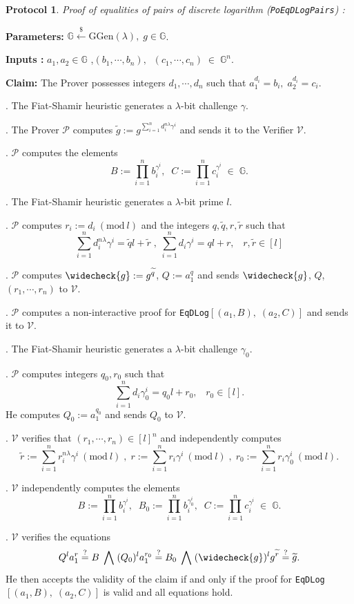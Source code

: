 \documentclass[11pt, lettersize, notitlepage, leqno, footskip=0.6cm]{article}
\newcommand{\slim}{\sum\limits}
\newcommand{\wti}{\widetilde}
\newcommand{\mc}{\mathcal}
\newcommand{\mb}{\mathbb}
\newcommand{\mr}{\mathrm}
\newcommand{\lam}{\lambda}
\newcommand{\lamb}{\lambda}
\newcommand{\weck}{\widecheck}
\newcommand{\mP}{\mc{P}}
\newcommand{\V}{\mc{V}}
\newcommand{\vs}{\vspace{-0.15cm}}
\newcommand{\noin}{\noindent}
\newcommand{\sta}{\stackrel{?}{=}}
\newcommand{\Mod}[1]{\ (\mathrm{mod}\ #1)}
\newtheorem{Prot}[Thm]{Protocol}
\numberwithin{equation}{section}
\begin{document}
\vspace{0.2cm}


\begin{Prot} \normalfont \textit{Proof of equalities of pairs of discrete logarithm} (\verb|PoEqDLogPairs|) :\end{Prot} \vspace{-0.3cm}

\noindent \textbf{Parameters:} $\mb{G}\xleftarrow{\$} \mr{GGen}(\lamb), \; g\in \mb{G}$.

\noindent \textbf{Inputs :} $a_1,a_2\in\mb{G}$  \;,\;$(b_1,\cdots, b_n), \;\;(c_1,\cdots, c_n)\;\in\; \mb{G}^n$.


\noindent \textbf{Claim:} The Prover possesses integers $d_1,\cdots, d_n$ such that $a_1^{d_i} = b_i,\; a_2^{d_i} = c_i$.

\begin{prf1} . The Fiat-Shamir heuristic generates a $\lam$-bit challenge $\gamma$.

\noin 2. The Prover $\mP$ computes $\wti{g}:= g^{\slim_{i=1}^n d_i^{n\lam}\gamma^i}$ and sends it to the Verifier $\V$.
 
\noin 3. $\mc{P}$ computes the elements \vs $$B:= \prod\limits_{i=1}^n b_i^{\gamma^i},\;\;C:= \prod\limits_{i=1}^n c_i^{\gamma^i}\;\in\; \mb{G}.$$

\noin 4. The Fiat-Shamir heuristic generates a $\lam$-bit prime $l$.

\noin 5. $\mP$ computes $r_i:= d_i\Mod{l}$ and the integers $q,\wti{q}, r,\wti{r}$ such that \vs $$\slim_{i=1}^n d_i^{n\lam}\gamma^i = \wti{q}l+\wti{r}\;,\;\slim_{i=1}^n d_i\gamma^i = ql+r,\;\;\;r,\wti{r}\in[l]$$

\noin 6. $\mP$ computes $\weck{g}:= g^{\wti{q}}$, $Q:= a_1^q$ and sends $\weck{g}$, $Q$, $(r_1,\cdots,r_n)$ to $\V$.   
 
. $\mc{P}$ computes a non-interactive proof for \verb|EqDLog|$[(a_1, B),\; (a_2, C)]$ and sends it to $\mc{V}$.

\noin 8. The Fiat-Shamir heuristic generates a $\lam$-bit challenge $\gamma_0$.

\noin 9. $\mP$ computes integers $q_0,r_0$ such that \vs $$\slim_{i=1}^n d_i\gamma_0^i = q_0l+r_0,\;\;\;r_0\in[l] .$$ He computes $Q_0:= a_1^{q_0}$ and sends $Q_0$ to $\V$.

. $\V$ verifies that $(r_1,\cdots,r_n)\in [l]^n$ and independently computes \vs $$\wti{r}:= \slim_{i=1}^n r_i^{n\lam}\gamma^i \Mod{l}\;,\;r:= \slim_{i=1}^n r_i\gamma^i \Mod{l}\;,\;r_0:= \slim_{i=1}^n r_i\gamma_0^i \Mod{l} .$$

\noin 11. $\V$ independently computes the elements \vs $$B:= \prod\limits_{i=1}^n b_i^{\gamma^i},\;\;B_0:= \prod\limits_{i=1}^n b_i^{\gamma_0^i},\;\;   C:= \prod\limits_{i=1}^n c_i^{\gamma^i}\;\in\; \mb{G}.$$

\noin 12. $\V$ verifies the equations \vs $$Q^la_1^{r}\sta B\;\bigwedge\;(Q_0)^la_1^{r_0}\sta B_0\;\bigwedge\; (\weck{g})^lg^{\wti{r}}\sta \wti{g} .$$ He then accepts the validity of the claim if and only if the proof for \verb|EqDLog|$[(a_1, B),\; (a_2, C)]$ is valid and all equations hold.\end{prf1}
\end{document}

